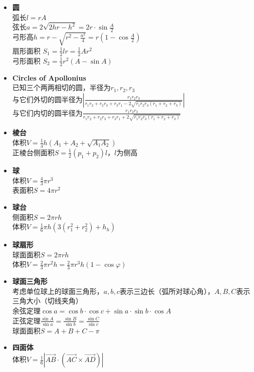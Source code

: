 \begin{itemize}[nosep, wide=0pt]
            \item \textbf{圆}
                \\弧长$ l = r A $
                \\弦长$ a = 2 \sqrt{2 h r - h^2} = 2 r \cdot \sin \frac{A}{2} $
                \\弓形高$ h = r - \sqrt{r^2 - \frac{a^2}{4}} = r (1 - \cos \frac{A}{2}) $
                \\扇形面积 $ S_1 = \frac{1}{2} l r = \frac{1}{2} A r^2 $
                \\弓形面积 $ S_2 = \frac{1}{2} r^2 (A - \sin A) $
            \item \textbf{Circles of Apollonius}
                \\已知三个两两相切的圆，半径为$ r_1, r_2, r_3 $
                \\与它们外切的圆半径为$ \left| \frac{r_1 r_2 r_3}{r_1 r_2 + r_2 r_3 + r_3 r_1 - 2 \sqrt{r_1 r_2 r_3 (r_1 + r_2 + r_3)}} \right| $
                \\与它们内切的圆半径为$ \frac{r_1 r_2 r_3}{r_1 r_2 + r_2 r_3 + r_3 r_1 + 2 \sqrt{r_1 r_2 r_3 (r_1 + r_2 + r_3)}} $
            \item \textbf{棱台}
                \\体积$ V = \frac{1}{3} h (A_1 + A_2 + \sqrt{A_1 A_2}) $
                \\正棱台侧面积$ S = \frac{1}{2} (p_1 + p_2) l $，$ l $为侧高
            \item \textbf{球}
                \\体积$ V = \frac{4}{3} \pi r^3 $
                \\表面积$ S = 4 \pi r^2 $
            \item \textbf{球台}
                \\侧面积$ S = 2 \pi r h $
                \\体积$ V = \frac{1}{6} \pi h (3(r_1^2 + r_2^2) + h_h) $
            \item \textbf{球扇形}
                \\球面面积$ S = 2 \pi r h $
                \\体积$ V = \frac{2}{3} \pi r^2 h = \frac{2}{3} \pi r^3 h (1 - \cos \varphi) $
            \item \textbf{球面三角形}
                \\考虑单位球上的球面三角形，$ a, b, c $表示三边长（弧所对球心角），$ A, B, C $表示三角大小（切线夹角）
                \\余弦定理$ \cos a = \cos b \cdot \cos c + \sin a \cdot \sin b \cdot \cos A $
                \\正弦定理$ \frac{\sin A}{\sin a} = \frac{\sin B}{\sin b} = \frac{\sin C}{\sin c} $
                \\球面面积$ S = A + B + C - \pi $
            \item \textbf{四面体}
                \\体积$ V = \frac{1}{6} \left| \overrightarrow{AB} \cdot (\overrightarrow{AC} \times \overrightarrow{AD}) \right| $
        \end{itemize}
